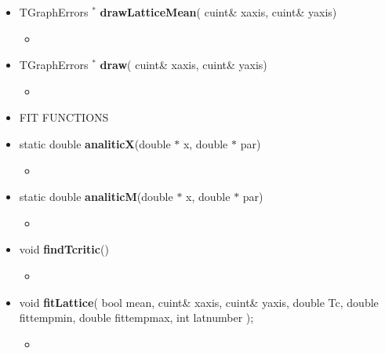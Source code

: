 \documentclass[11pt,a4paper]{article}
\begin{document}
\begin{itemize}
\begin{itemize}
			\item[] TGraphErrors ${}^*$ \textbf{drawLatticeMean}(
                             cuint\& x\textunderscore axis,
                             cuint\& y\textunderscore axis)		 
			\begin{itemize}
				\item[] 
			\end{itemize}
			
			\item[] TGraphErrors ${}^*$ \textbf{draw}(
                             cuint\& x\textunderscore axis,
                             cuint\& y\textunderscore axis)		 
			\begin{itemize}
				\item[] 
			\end{itemize}		

                           
		\item[] FIT FUNCTIONS \\
				
			\item[] static double \textbf{analiticX}(double $*$ x, double $*$ par)	 
			\begin{itemize}
				\item[] 
			\end{itemize}
			
			\item[] static double \textbf{analiticM}(double $*$ x, double $*$ par)			 
			\begin{itemize}
				\item[] 
			\end{itemize}
			
			\item[] void \textbf{findTcritic}()		 
			\begin{itemize}
				\item[] 
			\end{itemize}
			
			\item[] void \textbf{fitLattice}( bool mean,
                            				  cuint\& x\textunderscore axis,
                            				  cuint\& y\textunderscore axis,
                            				  double Tc,
                            				double fit\textunderscore temp\textunderscore min,
                            double fit\textunderscore temp\textunderscore max,
                            int lat\textunderscore number
                          );		 
			\begin{itemize}
				\item[] 
			\end{itemize}
			

\end{itemize}
\end{itemize}
\end{document}
